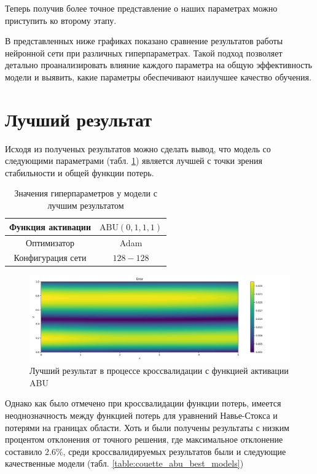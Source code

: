 Теперь получив более точное представление о наших параметрах можно приступить
ко второму этапу.

В представленных ниже графиках показано сравнение результатов работы нейронной сети
при различных гиперпараметрах. Такой подход позволяет детально проанализировать
влияние каждого параметра на общую эффективность модели и выявить, какие параметры
обеспечивают наилучшее качество обучения.




\section{Лучший результат}
Исходя из полученых результатов можно сделать вывод, что модель со следующими
параметрами (табл. \ref{table:couette_abu_best_params}) является лучшей с точки
зрения стабильности и общей функции потерь.

\begin{table}[ht]
    \centering
    \caption{Значения гиперпараметров у модели с лучшим результатом}
    \begin{tabular}{ |c|c| } 
        \hline
        Функция активации & $\text{ABU}(0, 1, 1, 1)$ \\
        \hline
        Оптимизатор & Adam \\ 
        \hline
        Конфигурация сети & $128-128$ \\ 
        \hline
    \end{tabular}
    \label{table:couette_abu_best_params}
\end{table}

\begin{figure}[ht]
    \includegraphics{data/couette_abu_error_best.png}
    \caption{Лучший результат в процессе кроссвалидации с функцией активации ABU}
    \label{fig:couette_abu_best}
\end{figure}

Однако как было отмечено при кроссвалидации функции потерь, имеется неоднозначность между
функцией потерь для уравнений Навье-Стокса и потерями на границах области. Хоть и были
получены результаты с низким процентом отклонения от точного решения, где максимальное
отклонение составило $2.6\%$, среди кроссвалидируемых результатов были и следующие
качественные модели (табл. \ref{table:couette_abu_best_models})

